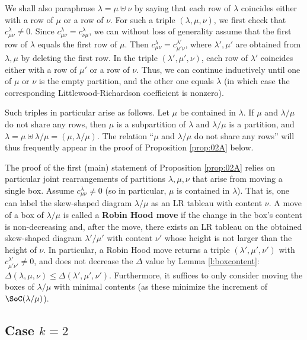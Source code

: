 \documentclass[12pt,dvipsnames,accepted=2016-08-18,a4paper,onecolumn]{quantumarticle}
\def\la{\lambda}
\def\la{\lambda}
\numberwithin{equation}{section}
\theoremstyle{definition}
\begin{document}
We shall also paraphrase $\lambda=\mu\uplus\nu$ by saying that each row of $\lambda$ coincides either with a row of $\mu$ or a row of $\nu$. 
For such a triple $(\lambda,\mu,\nu)$, we first check that $c^\lambda_{\mu \nu}\neq0$. 
Since $c^\lambda_{\mu \nu}=c^\lambda_{\nu\mu}$, we can without loss of generality assume that the first row of $\lambda$ equals the first row of $\mu$. 
Then $c^\lambda_{\mu\nu}=c^{\lambda'}_{\mu'\nu}$, where $\lambda',\mu'$ are obtained from $\lambda,\mu$ by deleting the first row. In the triple $(\lambda',\mu',\nu)$, each row of $\lambda'$ coincides either with a row of $\mu'$ or a row of $\nu$. Thus, we can continue inductively until one of $\mu$ or $\nu$ is the empty partition, and the other one equals $\lambda$ (in which case the corresponding Littlewood-Richardson coefficient is nonzero).

Such triples in particular arise as follows. Let $\mu$ be contained in $\lambda$. If $\mu$ and $\lambda/\mu$ do not share any rows, then $\mu$ is a subpartition of $\lambda$ and $\lambda/\mu$ is a partition, and $\lambda=\mu\uplus\lambda/\mu=(\mu,\lambda/\mu)$. The relation ``$\mu$ and $\lambda/\mu$ do not share any rows'' will thus frequently appear in the proof of Proposition \ref{prop:02A} below.

The proof of the first (main) statement of Proposition \ref{prop:02A} relies on particular joint rearrangements of partitions $\lambda,\mu,\nu$ that arise from moving a single box.  
Assume $c_{\mu\nu}^\lambda\neq0$ (so in particular, $\mu$ is contained in $\la$). 
That is, one can label the skew-shaped diagram $\la/\mu$ as an LR tableau with content $\nu$. 
A move of a box of $\la / \mu$ is called a \textbf{Robin Hood move} if the change in the box's content is non-decreasing and, after the move, there exists an LR tableau on the obtained skew-shaped diagram $\lambda'/\mu'$ with content $\nu'$ whose height is not larger than the height of $\nu$.
In particular, a Robin Hood move returns a triple $(\lambda',\mu',\nu')$ with $c^{\lambda'}_{\mu'\nu'}\neq0$, and does not decrease the $\Delta$ value by Lemma \ref{l:boxcontent}: 
$\Delta(\lambda,\mu,\nu)\le \Delta(\lambda',\mu',\nu')$.
Furthermore, it suffices to only consider moving the boxes of $\la/\mu$ with minimal contents (as these minimize the increment of $\SoC(\la/\mu)$).




\subsection{Case $k=2$}
\end{document}
